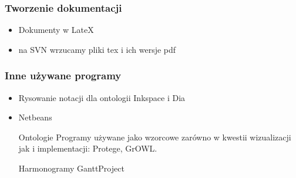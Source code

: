 \subsubsection{Tworzenie dokumentacji}
\begin{itemize}
 	\item Dokumenty w LateX
	\item na SVN wrzucamy pliki tex i ich wersje pdf
\end{itemize}


\subsubsection{Inne używane programy}
\begin{itemize}
 \item Rysowanie notacji dla ontologii  Inkspace i Dia
 \item Netbeans
 \item[Ontologie] Programy używane jako wzorcowe zarówno w kwestii wizualizacji jak i implementacji: Protege, GrOWL.
 \item[Harmonogramy] GanttProject
\end{itemize}

